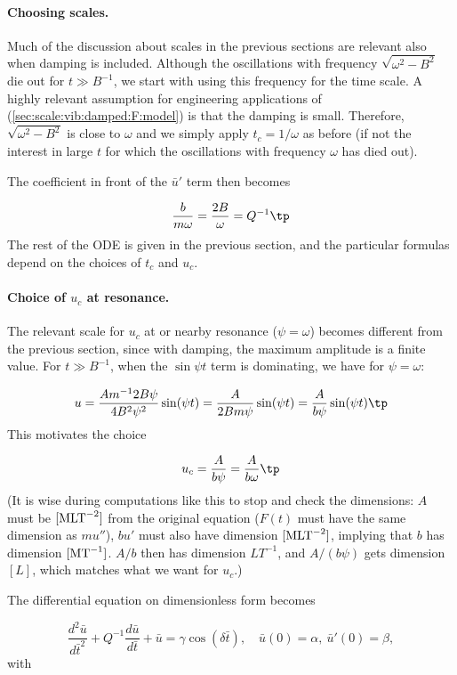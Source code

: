 \documentclass[graybox,envcountchap,sectrefs,final]{svmonodo}
\begin{document}
\paragraph{Choosing scales.}
Much of the discussion about scales in the previous sections are
relevant also when damping is included.  Although the oscillations
with frequency $\sqrt{\omega^2-B^2}$ die out for $t\gg B^{-1}$, we
start with using this frequency for the time scale.  A highly relevant
assumption for engineering applications of
(\ref{sec:scale:vib:damped:F:model}) is that the damping is small.
Therefore, $\sqrt{\omega^2-B^2}$ is close to $\omega$ and we simply
apply $t_c=1/\omega$ as before (if not the interest in large $t$ for
which the oscillations with frequency $\omega$ has died out).

The coefficient in front of the $\bar u'$ term then becomes

\[ \frac{b}{m\omega} = \frac{2B}{\omega} = Q^{-1}\tp\]
The rest of the ODE is given in the previous section, and the particular
formulas depend on the choices of $t_c$ and $u_c$.

\paragraph{Choice of $u_c$ at resonance.}
The relevant scale for $u_c$ at or nearby resonance ($\psi = \omega$)
becomes different from the previous section, since with damping,
the maximum amplitude is a finite value. For $t\gg B^{-1}$, when the
$\sin\psi t$ term is dominating, we have for $\psi = \omega$:

\[ u = \frac{Am^{-1}2B\psi}{4B^2\psi^2}\sin (\psi t) =
\frac{A}{2Bm\psi}\sin (\psi t) =
\frac{A}{b\psi}\sin (\psi t)
\tp
\]
This motivates the choice

\[ u_c = \frac{A}{b\psi} = \frac{A}{b\omega}\tp\]
(It is wise during computations like this to stop and check the
dimensions: $A$ must be $[\hbox{MLT}^{-2}]$ from the original
equation ($F(t)$ must have the same dimension as $mu''$),
$bu'$ must also have dimension $[\hbox{MLT}^{-2}]$, implying that
$b$ has dimension $[\hbox{MT}^{-1}]$. $A/b$ then has dimension
$LT^{-1}$, and $A/(b\psi)$ gets dimension $[L]$, which matches
what we want for $u_c$.)

The differential equation on dimensionless form becomes

\begin{equation}
\frac{d^2\bar u}{d\bar t^2} + Q^{-1}\frac{d\bar u}{d\bar t} + \bar u =
\gamma
\cos(\delta\bar t),
\quad \bar u(0)=\alpha,\ \bar u'(0)=\beta,
\label{sec:scale:vib:damped:F:model:scaled1}
\end{equation}
with
\end{document}
